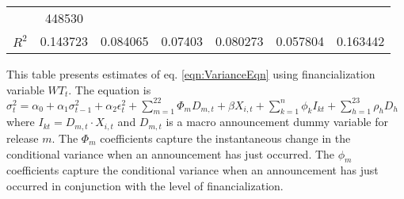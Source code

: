 \begin{sidewaystable}
{\begin{tabular}{@{}lllllllllllll@{}}
                                    & \multicolumn{2}{c}{ 448530 }                                                 \\ \textbf{$R^2$}             &\multicolumn{2}{c}{ 0.143723 }                                                 & \multicolumn{2}{c}{ 0.084065 }                                                 & \multicolumn{2}{c}{ 0.07403 }                                                 & \multicolumn{2}{c}{ 0.080273 }                                                 & \multicolumn{2}{c}{ 0.057804 }                                                   & \multicolumn{2}{c}{ 0.163442 }                                                 \\ \bottomrule 
\end{tabular}
}
\begin{tablenotes}\item 
        \singlespacing
        \footnotesize
        This table presents estimates of eq. \ref{eqn:VarianceEqn} using financialization variable $WT_t$. The equation is $\sigma_{t}^2=\alpha_0+\alpha_1 \sigma_{t-1}^2+\alpha_2 \epsilon_t^2 +\sum_{m=1}^{22} \Phi_m D_{m,t}+\beta X_{i,t}+\sum_{k=1}^n \phi_k I_{kt} + \sum_{h=1}^{23} \rho_h D_h$ where $I_{kt}=D_{m,t} \cdot X_{i,t}$ and $D_{m,t}$ is a macro announcement dummy variable for release $m$. The $\Phi_m$ coefficients capture the instantaneous change in the conditional variance when an announcement has just occurred. The $\phi_m$ coefficients capture the conditional variance when an announcement has just occurred in conjunction with the level of financialization.
\end{tablenotes}
\end{sidewaystable}

